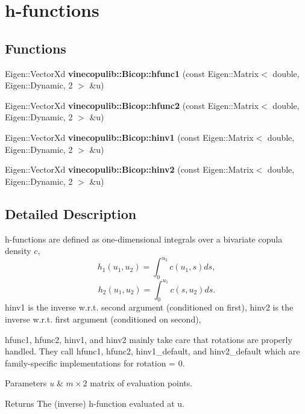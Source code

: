 \hypertarget{group__hfunctions}{}\section{h-\/functions}
\label{group__hfunctions}
\subsection*{Functions}
\begin{DoxyCompactItemize}
\item 
Eigen\+::\+Vector\+Xd {\bfseries vinecopulib\+::\+Bicop\+::hfunc1} (const Eigen\+::\+Matrix$<$ double, Eigen\+::\+Dynamic, 2 $>$ \&u)\hypertarget{group__hfunctions_ga130fda62cd61c7acdef5db75fffdd89e}{}\label{group__hfunctions_ga130fda62cd61c7acdef5db75fffdd89e}

\item 
Eigen\+::\+Vector\+Xd {\bfseries vinecopulib\+::\+Bicop\+::hfunc2} (const Eigen\+::\+Matrix$<$ double, Eigen\+::\+Dynamic, 2 $>$ \&u)\hypertarget{group__hfunctions_ga4c9b50f99797ec374f5057cc54db2bd8}{}\label{group__hfunctions_ga4c9b50f99797ec374f5057cc54db2bd8}

\item 
Eigen\+::\+Vector\+Xd {\bfseries vinecopulib\+::\+Bicop\+::hinv1} (const Eigen\+::\+Matrix$<$ double, Eigen\+::\+Dynamic, 2 $>$ \&u)\hypertarget{group__hfunctions_ga3cc8b161ec6efdb3b34d2efa9185bf44}{}\label{group__hfunctions_ga3cc8b161ec6efdb3b34d2efa9185bf44}

\item 
Eigen\+::\+Vector\+Xd {\bfseries vinecopulib\+::\+Bicop\+::hinv2} (const Eigen\+::\+Matrix$<$ double, Eigen\+::\+Dynamic, 2 $>$ \&u)\hypertarget{group__hfunctions_ga3e33ec227b6b7182e327399201cad382}{}\label{group__hfunctions_ga3e33ec227b6b7182e327399201cad382}

\end{DoxyCompactItemize}


\subsection{Detailed Description}
h-\/functions are defined as one-\/dimensional integrals over a bivariate copula density $ c $, \[ h_1(u_1, u_2) = \int_0^{u_2} c(u_1, s) ds, \] \[ h_2(u_1, u_2) = \int_0^{u_1} c(s, u_2) ds. \] {\ttfamily hinv1} is the inverse w.\+r.\+t. second argument (conditioned on first), {\ttfamily hinv2} is the inverse w.\+r.\+t. first argument (conditioned on second),

{\ttfamily hfunc1}, {\ttfamily hfunc2}, {\ttfamily hinv1}, and {\ttfamily hinv2} mainly take care that rotations are properly handled. They call {\ttfamily hfunc1}, {\ttfamily hfunc2}, {\ttfamily hinv1\+\_\+default}, and hinv2\+\_\+default which are family-\/specific implementations for {\ttfamily rotation = 0}.


\begin{DoxyParams}{Parameters}
{\em u} & $m \times 2$ matrix of evaluation points. \\
\hline
\end{DoxyParams}
\begin{DoxyReturn}{Returns}
The (inverse) h-\/function evaluated at {\ttfamily u}. 
\end{DoxyReturn}
